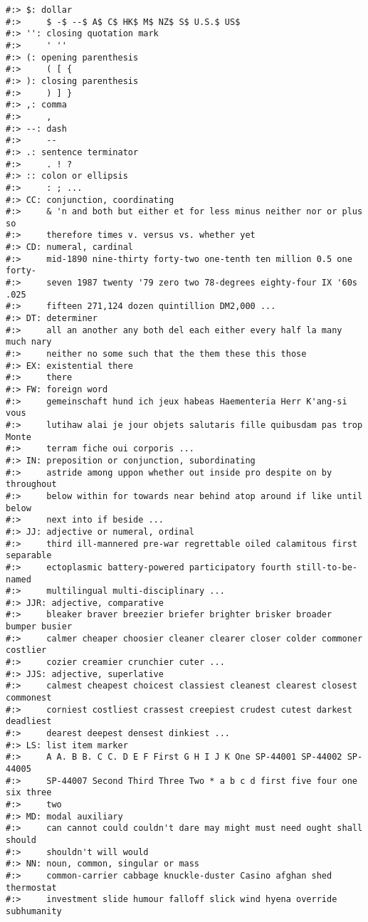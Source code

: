 \documentclass[
]{book}
\begin{document}
\begin{verbatim}
#:> $: dollar
#:>     $ -$ --$ A$ C$ HK$ M$ NZ$ S$ U.S.$ US$
#:> '': closing quotation mark
#:>     ' ''
#:> (: opening parenthesis
#:>     ( [ {
#:> ): closing parenthesis
#:>     ) ] }
#:> ,: comma
#:>     ,
#:> --: dash
#:>     --
#:> .: sentence terminator
#:>     . ! ?
#:> :: colon or ellipsis
#:>     : ; ...
#:> CC: conjunction, coordinating
#:>     & 'n and both but either et for less minus neither nor or plus so
#:>     therefore times v. versus vs. whether yet
#:> CD: numeral, cardinal
#:>     mid-1890 nine-thirty forty-two one-tenth ten million 0.5 one forty-
#:>     seven 1987 twenty '79 zero two 78-degrees eighty-four IX '60s .025
#:>     fifteen 271,124 dozen quintillion DM2,000 ...
#:> DT: determiner
#:>     all an another any both del each either every half la many much nary
#:>     neither no some such that the them these this those
#:> EX: existential there
#:>     there
#:> FW: foreign word
#:>     gemeinschaft hund ich jeux habeas Haementeria Herr K'ang-si vous
#:>     lutihaw alai je jour objets salutaris fille quibusdam pas trop Monte
#:>     terram fiche oui corporis ...
#:> IN: preposition or conjunction, subordinating
#:>     astride among uppon whether out inside pro despite on by throughout
#:>     below within for towards near behind atop around if like until below
#:>     next into if beside ...
#:> JJ: adjective or numeral, ordinal
#:>     third ill-mannered pre-war regrettable oiled calamitous first separable
#:>     ectoplasmic battery-powered participatory fourth still-to-be-named
#:>     multilingual multi-disciplinary ...
#:> JJR: adjective, comparative
#:>     bleaker braver breezier briefer brighter brisker broader bumper busier
#:>     calmer cheaper choosier cleaner clearer closer colder commoner costlier
#:>     cozier creamier crunchier cuter ...
#:> JJS: adjective, superlative
#:>     calmest cheapest choicest classiest cleanest clearest closest commonest
#:>     corniest costliest crassest creepiest crudest cutest darkest deadliest
#:>     dearest deepest densest dinkiest ...
#:> LS: list item marker
#:>     A A. B B. C C. D E F First G H I J K One SP-44001 SP-44002 SP-44005
#:>     SP-44007 Second Third Three Two * a b c d first five four one six three
#:>     two
#:> MD: modal auxiliary
#:>     can cannot could couldn't dare may might must need ought shall should
#:>     shouldn't will would
#:> NN: noun, common, singular or mass
#:>     common-carrier cabbage knuckle-duster Casino afghan shed thermostat
#:>     investment slide humour falloff slick wind hyena override subhumanity

\end{verbatim}
\end{document}
